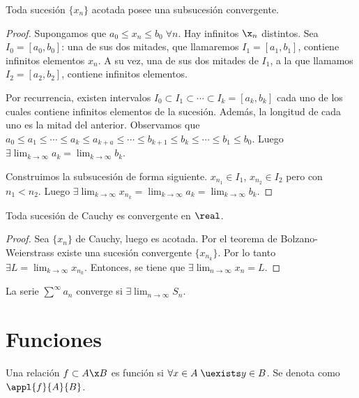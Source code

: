 \documentclass[nochap]{apuntes}
\begin{document}
\begin{theorem}
Toda sucesión $\{x_n\}$ acotada posee una subsucesión convergente.
\end{theorem}

\begin{proof}
Supongamos que $a_0 ≤ x_n ≤ b_0\; \forall n$. Hay infinitos $\x_n$ distintos. Sea $I_0=[a_0, b_0]$: una de sus dos mitades, que llamaremos $I_1=[a_1,b_1]$, contiene infinitos elementos $x_n$. A su vez, una de sus dos mitades de $I_1$, a la que llamamos $I_2=[a_2, b_2]$, contiene infinitos elementos.

Por recurrencia, existen intervalos $I_0 \subset I_1 \subset \cdots \subset I_k=[a_k, b_k]$ cada uno de los cuales contiene infinitos elementos de la sucesión. Además, la longitud de cada uno es la mitad del anterior. Observamos que $a_0 \leq a_1 \leq \cdots \leq a_k \leq a_{k+a} \leq \cdots \leq b_{k+1} \leq b_k \leq \cdots \leq b_1 \leq b_0$. Luego $\exists \lim_{k\to\infty}a_k =\lim_{k\to\infty}b_k$.

Construimos la subsucesión de forma siguiente. $x_{n_1} \in I_1$, $x_{n_2} \in I_2$ pero con $n_1 < n_2$. Luego $\exists \lim_{k\to\infty} x_{n_k} = \lim_{k\to\infty}a_k =\lim_{k\to\infty}b_k$.
\end{proof}

\begin{corol}Toda sucesión de Cauchy es convergente en $\real$.\end{corol}

\begin{proof}Sea $\{x_n\}$ de Cauchy, luego es acotada. Por el teorema de Bolzano-Weierstrass existe una sucesión convergente $\{x_{n_k}\}$. Por lo tanto $\exists L = \lim_{k\to\infty}x_{n_k}$. Entonces, se tiene que $\exists \lim_{n\to\infty} x_n = L$.\end{proof}

\begin{lemma}La serie $\sum^{\infty}a_n$ converge si $\exists\lim_{n\to\infty}S_n$.\end{lemma}

\section{Funciones}

\begin{defn}[Función]
Una relación $f\subset A\x B$ es función si $\forall x \in A \; \uexists y \in B$. Se denota como $\appl{f}{A}{B}$.
\end{defn}
\end{document}

